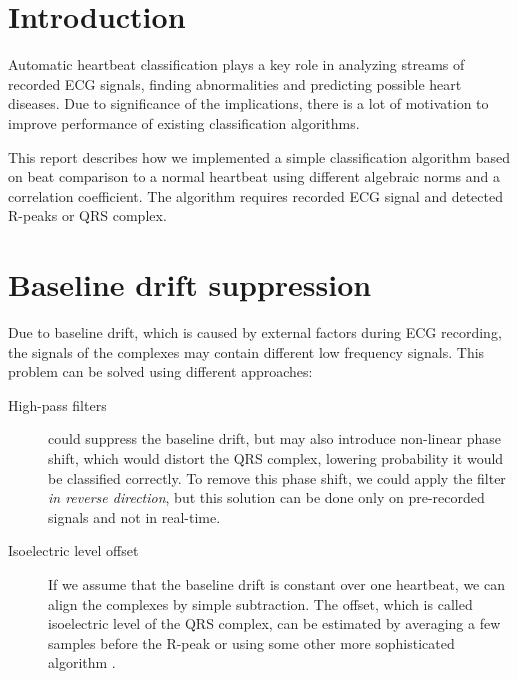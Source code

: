 \documentclass[fleqn,moreauthors,10pt]{ds_report}
\affiliation{\textsuperscript{1}\textit{ae4664@student.uni-lj.si, 63160011}}
\begin{document}
\flushbottom

\maketitle

\thispagestyle{empty}


\section*{Introduction}
	
Automatic heartbeat classification plays a key role in analyzing streams of recorded ECG signals, finding abnormalities and predicting possible heart diseases. Due to significance of the implications, there is a lot of motivation to improve performance of existing classification algorithms.

This report describes how we implemented a simple classification algorithm based on beat comparison to a normal heartbeat using different algebraic norms and a correlation coefficient. The algorithm requires recorded ECG signal and detected R-peaks or QRS complex.


\section*{Baseline drift suppression}

Due to baseline drift, which is caused by external factors during ECG recording, the signals of the complexes may contain different low frequency signals. This problem can be solved using different approaches:
\begin{description}
	\item[High-pass filters] could suppress the baseline drift, but may also introduce non-linear phase shift, which would distort the QRS complex, lowering probability it would be classified correctly. To remove this phase shift, we could apply the filter \textit{in reverse direction}, but this solution can be done only on pre-recorded signals and not in real-time.
	\item[Isoelectric level offset] If we assume that the baseline drift is constant over one heartbeat, we can align the complexes by simple  subtraction. The offset, which is called isoelectric level of the QRS complex, can be estimated by averaging a few samples before the R-peak or using some other more sophisticated algorithm \cite{iso_estimation}. 
\end{description}
\end{document}
